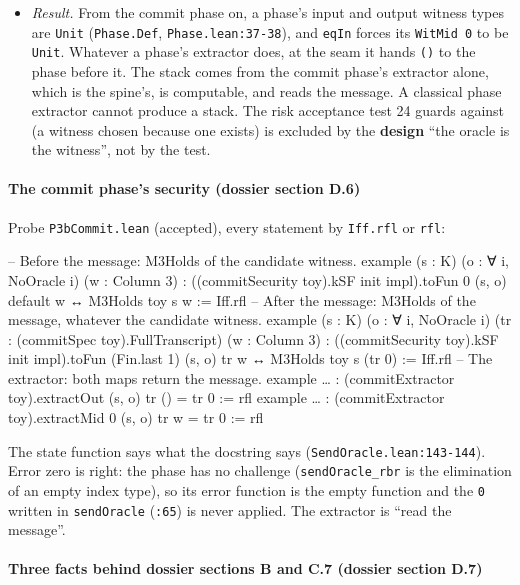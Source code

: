 \begin{itemize}
\item \emph{Result.} From the commit phase on, a phase's input and output witness types are \texttt{Unit} (\texttt{Phase.\allowbreak{}Def}, \texttt{Phase.\allowbreak{}lean:37-{}38}), and \texttt{eqIn} forces its \texttt{WitMid 0} to be \texttt{Unit}. Whatever a phase's extractor does, at the seam it hands \texttt{(\allowbreak{})} to the phase before it. The stack comes from the commit phase's extractor alone, which is the spine's, is computable, and reads the message. A classical phase extractor cannot produce a stack. The risk acceptance test 24 guards against (a witness chosen because one exists) is excluded by the \textbf{design} \enquote{the oracle is the witness}, not by the test.
\end{itemize}

\paragraph{The commit phase's security (dossier section D.6)}\label{sec:gen-spine-D6}

Probe \texttt{P3bCommit.\allowbreak{}lean} (accepted), every statement by \texttt{Iff.\allowbreak{}rfl} or \texttt{rfl}:

\begin{leancode}
-- Before the message: M3Holds of the candidate witness.
example (s : K) (o : ∀ i, NoOracle i) (w : Column 3) :
    ((commitSecurity toy).kSF init impl).toFun 0 (s, o) default w ↔ M3Holds toy s w := Iff.rfl
-- After the message: M3Holds of the message, whatever the candidate witness.
example (s : K) (o : ∀ i, NoOracle i) (tr : (commitSpec toy).FullTranscript) (w : Column 3) :
    ((commitSecurity toy).kSF init impl).toFun (Fin.last 1) (s, o) tr w ↔
      M3Holds toy s (tr 0) := Iff.rfl
-- The extractor: both maps return the message.
example … : (commitExtractor toy).extractOut (s, o) tr () = tr 0 := rfl
example … : (commitExtractor toy).extractMid 0 (s, o) tr w = tr 0 := rfl
\end{leancode}

The state function says what the docstring says (\texttt{SendOracle.\allowbreak{}lean:143-{}144}). Error zero is right: the phase has no challenge (\texttt{sendOracle\_\allowbreak{}rbr} is the elimination of an empty index type), so its error function is the empty function and the \texttt{0} written in \texttt{sendOracle} (\texttt{:65}) is never applied. The extractor is \enquote{read the message}.

\paragraph{Three facts behind dossier sections B and C.7 (dossier section D.7)}\label{sec:gen-spine-D7}

